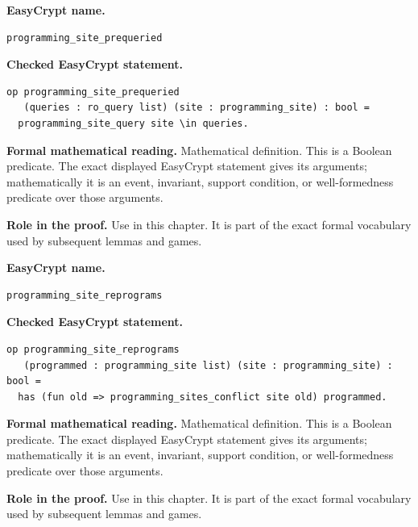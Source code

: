 \begin{formaldefinition}
\noindent\textbf{EasyCrypt name.}
\begin{lstlisting}[language=EasyCrypt,basicstyle=\ttfamily\scriptsize]
programming_site_prequeried
\end{lstlisting}
\noindent\textbf{Checked EasyCrypt statement.}
\begin{lstlisting}[language=EasyCrypt,basicstyle=\ttfamily\scriptsize]
op programming_site_prequeried
   (queries : ro_query list) (site : programming_site) : bool =
  programming_site_query site \in queries.
\end{lstlisting}
\noindent\textbf{Formal mathematical reading.}
Mathematical definition. This is a Boolean predicate.  The exact displayed EasyCrypt statement gives its arguments; mathematically it is an event, invariant, support condition, or well-formedness predicate over those arguments.

\noindent\textbf{Role in the proof.}
Use in this chapter. It is part of the exact formal vocabulary used by subsequent lemmas and games.

\end{formaldefinition}

\begin{formaldefinition}
\noindent\textbf{EasyCrypt name.}
\begin{lstlisting}[language=EasyCrypt,basicstyle=\ttfamily\scriptsize]
programming_site_reprograms
\end{lstlisting}
\noindent\textbf{Checked EasyCrypt statement.}
\begin{lstlisting}[language=EasyCrypt,basicstyle=\ttfamily\scriptsize]
op programming_site_reprograms
   (programmed : programming_site list) (site : programming_site) : bool =
  has (fun old => programming_sites_conflict site old) programmed.
\end{lstlisting}
\noindent\textbf{Formal mathematical reading.}
Mathematical definition. This is a Boolean predicate.  The exact displayed EasyCrypt statement gives its arguments; mathematically it is an event, invariant, support condition, or well-formedness predicate over those arguments.

\noindent\textbf{Role in the proof.}
Use in this chapter. It is part of the exact formal vocabulary used by subsequent lemmas and games.

\end{formaldefinition}

